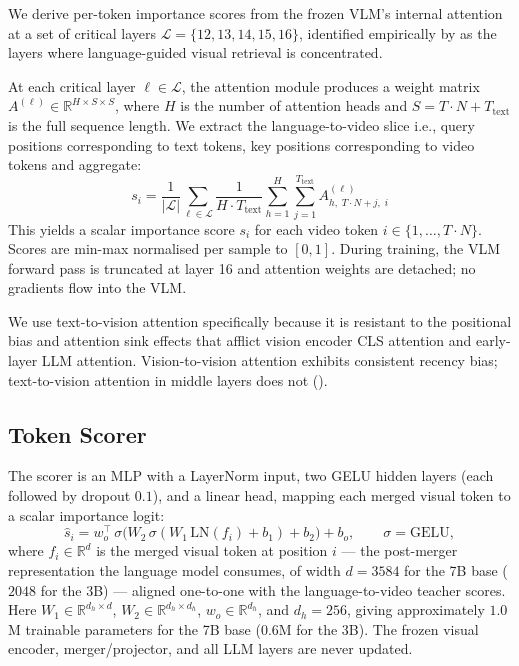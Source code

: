 \documentclass[12pt]{article}
\begin{document}
We derive per-token importance scores from the frozen VLM's internal
attention at a set of critical layers $\mathcal{L} = \{12, 13, 14,
15, 16\}$, identified empirically by \textcite{gou2025empiricalstudyvideollmsanswer} as the
layers where language-guided visual retrieval is concentrated.
 
At each critical layer $\ell \in \mathcal{L}$, the attention module
produces a weight matrix $A^{(\ell)} \in \mathbb{R}^{H \times S \times
S}$, where $H$ is the number of attention heads and $S = T \cdot N +
T_{\text{text}}$ is the full sequence length. We extract the
language-to-video slice i.e., query positions corresponding to text
tokens, key positions corresponding to video tokens and aggregate:
%
\begin{equation}
    s_i = \frac{1}{|\mathcal{L}|}
    \sum_{\ell \in \mathcal{L}}
    \frac{1}{H \cdot T_{\text{text}}}
    \sum_{h=1}^{H}
    \sum_{j=1}^{T_{\text{text}}}
    A^{(\ell)}_{h,\; T \cdot N + j,\; i}
\end{equation}
%
This yields a scalar importance score $s_i$ for each video token $i
\in \{1, \ldots, T \cdot N\}$. Scores are min-max normalised per
sample to $[0, 1]$. During training, the VLM forward pass is truncated
at layer 16 and attention weights are detached; no gradients flow into
the VLM.
 
We use text-to-vision attention specifically because it is resistant to
the positional bias and attention sink effects that afflict vision
encoder CLS attention and early-layer LLM
attention. Vision-to-vision
attention exhibits consistent recency bias; text-to-vision attention in
middle layers does not (\cite{takezoe2026learnprunerrethinkingattentionbasedtoken}).
 
\subsection{Token Scorer}
 
The scorer is an MLP with a LayerNorm input, two GELU hidden layers
(each followed by dropout $0.1$), and a linear head, mapping each merged
visual token to a scalar importance logit:
%
\begin{equation}
    \hat{s}_i = w_o^{\top}\,\sigma\!\big(W_2\,\sigma(W_1\,\text{LN}(f_i)
    + b_1) + b_2\big) + b_o,
    \qquad \sigma = \text{GELU},
\end{equation}
%
where $f_i \in \mathbb{R}^{d}$ is the merged visual token at position
$i$ --- the post-merger representation the language model consumes, of
width $d = 3584$ for the 7B base ($2048$ for the 3B) --- aligned
one-to-one with the language-to-video teacher scores. Here $W_1 \in
\mathbb{R}^{d_h \times d}$, $W_2 \in \mathbb{R}^{d_h \times d_h}$, $w_o
\in \mathbb{R}^{d_h}$, and $d_h = 256$, giving approximately $1.0$M
trainable parameters for the 7B base ($0.6$M for the 3B). The frozen
visual encoder, merger/projector, and all LLM layers are never updated.
 
\end{document}
